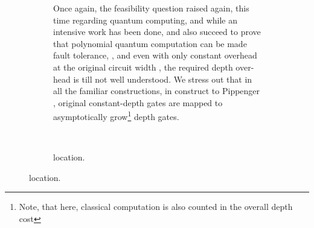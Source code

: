 \documentclass[manuscript,screen,review]{acmart}
\begin{document}
{\begin{figure}[h]
\begin{subfigure}[h]{0.40\textwidth}
  Once again, the feasibility question raised again, this time regarding quantum computing, and while an intensive work has been done, and also succeed to prove that polynomial quantum computation can be made fault tolerance, \cite{aharonov1999faulttolerant},\cite{gottesman2014faulttolerant} and even with only constant overhead at the original circuit width \cite{grospellier:tel-03364419}, the required depth over-head is till not well understood. We stress out that in all the familiar constructions, in construct to Pippenger \cite{Pippenger}, original constant-depth gates are mapped to asymptotically grow\footnote{Note, that here, classical computation is also counted in the overall depth cost} depth gates. 
    \end{subfigure}
    \begin{subfigure}[h]{0.05\textwidth}
      \
    \end{subfigure}
    \begin{subfigure}[h]{0.40\textwidth} 

    \caption{location.}
    \label{fig:location}
    \end{subfigure} 
  \end{figure}




}
\end{document}

